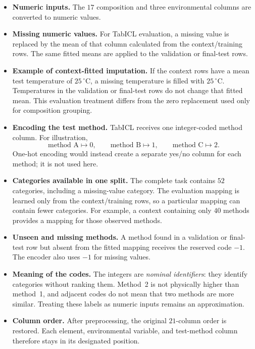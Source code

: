 \documentclass[11pt]{article}
\newenvironment{notes}
  {\begin{itemize}\setlength{\itemsep}{0.45em}\setlength{\parsep}{0pt}}
  {\end{itemize}}
\begin{document}
\begin{notes}
    \item \textbf{Numeric inputs.} The \(17\) composition and three
    environmental columns are converted to numeric values.

    \item \textbf{Missing numeric values.} For TabICL evaluation,
    a missing value is replaced by the mean of that column calculated
    from the context/training rows. The same fitted means are applied
    to the validation or final-test rows.

    \item \textbf{Example of context-fitted imputation.} If the
    context rows have a mean test temperature of
    \(25\,^{\circ}\mathrm{C}\), a missing temperature is filled with
    \(25\,^{\circ}\mathrm{C}\). Temperatures in the validation or
    final-test rows do not change that fitted mean. This evaluation
    treatment differs from the zero replacement used only for
    composition grouping.

    \item \textbf{Encoding the test method.} TabICL receives one
    integer-coded method column. For illustration,
    \[
        \text{method A}\mapsto0,\qquad
        \text{method B}\mapsto1,\qquad
        \text{method C}\mapsto2.
    \]
    One-hot encoding would instead create a separate yes/no column
    for each method; it is not used here.

    \item \textbf{Categories available in one split.} The complete
    task contains \(52\) categories, including a missing-value category.
    The evaluation mapping is learned only from the context/training
    rows, so a particular mapping can contain fewer categories.
    For example, a context containing only \(40\) methods provides a
    mapping for those observed methods.

    \item \textbf{Unseen and missing methods.} A method found in a
    validation or final-test row but absent from the fitted mapping
    receives the reserved code \(-1\). The encoder also uses
    \(-1\) for missing values.

    \item \textbf{Meaning of the codes.} The integers are
    \emph{nominal identifiers}: they identify categories without
    ranking them. Method~2 is not physically higher than method~1,
    and adjacent codes do not mean that two methods are more similar.
    Treating these labels as numeric inputs remains an approximation.

    \item \textbf{Column order.} After preprocessing, the original
    \(21\)-column order is restored. Each element, environmental
    variable, and test-method column therefore stays in its designated
    position.
\end{notes}
\end{document}
